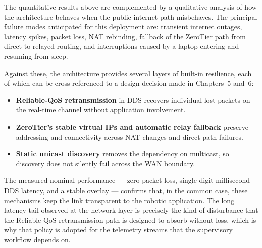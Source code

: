 The quantitative results above are complemented by a qualitative analysis of how the architecture behaves when the public-internet path misbehaves. The principal failure modes anticipated for this deployment are: transient internet outages, latency spikes, packet loss, NAT rebinding, fallback of the ZeroTier path from direct to relayed routing, and interruptions caused by a laptop entering and resuming from sleep.

Against these, the architecture provides several layers of built-in resilience, each of which can be cross-referenced to a design decision made in Chapters~5 and~6:

\begin{itemize}
    \item \textbf{Reliable-QoS retransmission} in DDS recovers individual lost packets on the real-time channel without application involvement.
    \item \textbf{ZeroTier's stable virtual IPs and automatic relay fallback} preserve addressing and connectivity across NAT changes and direct-path failures.
    \item \textbf{Static unicast discovery} removes the dependency on multicast, so discovery does not silently fail across the WAN boundary.
\end{itemize}

The measured nominal performance --- zero packet loss, single-digit-millisecond DDS latency, and a stable overlay --- confirms that, in the common case, these mechanisms keep the link transparent to the robotic application. The long latency tail observed at the network layer is precisely the kind of disturbance that the Reliable-QoS retransmission path is designed to absorb without loss, which is why that policy is adopted for the telemetry streams that the supervisory workflow depends on.
